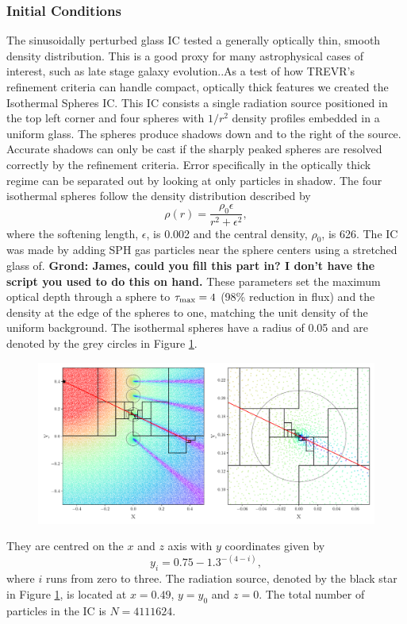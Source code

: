 \documentclass[fleq,usenatbib]{mnras}
\newcommand{\acro}{TREVR}
\newcommand{\comment}[1]{\textbf{\color{red}#1}}
\begin{document}
\subsubsection{Initial Conditions}
The sinusoidally perturbed glass IC tested a generally optically thin, smooth 
density distribution. This is a good proxy for many astrophysical cases of 
interest, such as late stage galaxy evolution..As a test of how \acro{}'s 
refinement criteria can handle compact, optically thick features we created 
the Isothermal Spheres IC. This IC consists a single radiation source 
positioned in the top left corner and four spheres with $1/r^2$ density 
profiles embedded in a uniform glass. The spheres produce shadows down and to 
the right of the source. Accurate shadows can only be cast if the sharply 
peaked spheres are resolved correctly by the refinement criteria. Error 
specifically in the optically thick regime can be separated out by looking at 
only particles in shadow. The four isothermal spheres follow the density 
distribution described by
\begin{equation}
\rho(r) = \frac{\rho_0 \epsilon}{r^2 + \epsilon^2},
\end{equation}
where the softening length, $\epsilon$, is 0.002 and the central density, 
$\rho_0$, is 626. The IC was made by adding SPH gas particles near the 
sphere centers using a stretched glass of. \comment{Grond: James, could you 
fill this part in? I don't have the script you used to do this on hand.} These 
parameters set the maximum optical depth through a sphere to 
$\tau_{\rm max}=4$ (98\% reduction in flux) and the density at the edge of the 
spheres to one, matching the unit density of the uniform background. The 
isothermal spheres have a radius of 0.05 and are denoted by the grey circles 
in Figure \ref{fig:cellplot}.  
\begin{figure}
\includegraphics[width=1\linewidth]{Figures/cellplot.pdf}
\caption{}
\label{fig:cellplot}
\end{figure}
They are centred on the $x$ and $z$ axis with $y$ coordinates given by
\begin{equation}
y_i = 0.75 - 1.3^{-(4-i)},
\end{equation}
where $i$ runs from zero to three. The radiation source, denoted by the black 
star in Figure \ref{fig:cellplot}, is located at $x=0.49$, $y=y_0$ and $z=0$. 
The total number of particles in the IC is $N=4111624$.
\end{document}
